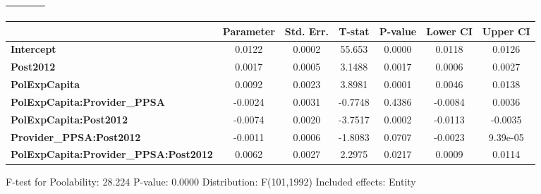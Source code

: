 \begin{center}
\begin{tabular}{lclc}
\textbf{}                                     &                    & \textbf{                     }   &                  \\
\bottomrule
\end{tabular}
\begin{tabular}{lcccccc}
                                              & \textbf{Parameter} & \textbf{Std. Err.} & \textbf{T-stat} & \textbf{P-value} & \textbf{Lower CI} & \textbf{Upper CI}  \\
\midrule
\textbf{Intercept}                            &       0.0122       &       0.0002       &      55.653     &      0.0000      &       0.0118      &       0.0126       \\
\textbf{Post2012}                             &       0.0017       &       0.0005       &      3.1488     &      0.0017      &       0.0006      &       0.0027       \\
\textbf{PolExpCapita}                         &       0.0092       &       0.0023       &      3.8981     &      0.0001      &       0.0046      &       0.0138       \\
\textbf{PolExpCapita:Provider\_PPSA}          &      -0.0024       &       0.0031       &     -0.7748     &      0.4386      &      -0.0084      &       0.0036       \\
\textbf{PolExpCapita:Post2012}                &      -0.0074       &       0.0020       &     -3.7517     &      0.0002      &      -0.0113      &      -0.0035       \\
\textbf{Provider\_PPSA:Post2012}              &      -0.0011       &       0.0006       &     -1.8083     &      0.0707      &      -0.0023      &      9.39e-05      \\
\textbf{PolExpCapita:Provider\_PPSA:Post2012} &       0.0062       &       0.0027       &      2.2975     &      0.0217      &       0.0009      &       0.0114       \\
\bottomrule
\end{tabular}
\end{center}

F-test for Poolability: 28.224 \newline
 P-value: 0.0000 \newline
 Distribution: F(101,1992) \newline
  \newline
 Included effects: Entity